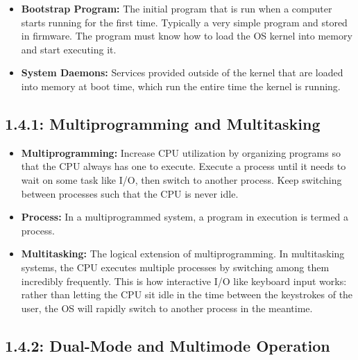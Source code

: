 \documentclass[12pt]{article}
\begin{document}
\begin{itemize}
    \item \textbf{Bootstrap Program:} The initial program that is run when a computer starts running for the first time. Typically a very simple program and stored in firmware. The program must know how to load the OS kernel into memory and start executing it.
    \item \textbf{System Daemons:} Services provided outside of the kernel that are loaded into memory at boot time, which run the entire time the kernel is running.
\end{itemize}

\subsection*{1.4.1: Multiprogramming and Multitasking}

\begin{itemize}
    \item \textbf{Multiprogramming:} Increase CPU utilization by organizing programs so that the CPU always has one to execute. Execute a process until it needs to wait on some task like I/O, then switch to another process. Keep switching between processes such that the CPU is never idle.
    \item \textbf{Process:} In a multiprogrammed system, a program in execution is termed a process.
    \item \textbf{Multitasking:} The logical extension of multiprogramming. In multitasking systems, the CPU executes multiple processes by switching among them incredibly frequently. This is how interactive I/O like keyboard input works: rather than letting the CPU sit idle in the time between the keystrokes of the user, the OS will rapidly switch to another process in the meantime.
\end{itemize}

\subsection*{1.4.2: Dual-Mode and Multimode Operation}
\end{document}
